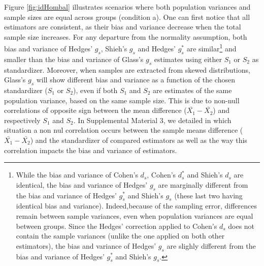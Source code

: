 \documentclass[
  english,
  man,floatsintext]{apa6}
\begin{document}
Figure \ref{fig:idHombal} illustrates scenarios where both population variances and sample sizes are equal across groups (condition a). One can first notice that all estimators are consistent, as their bias and variance decrease when the total sample size increases. For any departure from the normality assumption, both bias and variance of Hedges' \(g_s\), Shieh's \(g_s\) and Hedges' \(g^*_s\) are similar\footnote{While the bias and variance of Cohen's $d_s$, Cohen's $d^*_s$ and Shieh's $d_s$ are identical, the bias and variance of Hedges' $g_s$ are marginally different from the bias and variance of Hedges' $g^*_s$ and Shieh's $g_s$ (these last two having identical bias and variance). Indeed,because of the sampling error, differences remain between sample variances, even when population variances are equal between groups. Since the Hedges' correction applied to Cohen's $d_s$ does not contain the sample variances (unlike the one applied on both other estimators), the bias and variance of Hedges' $g_s$ are slighly different from the bias and variance of Hedges' $g^*_s$ and Shieh's $g_s$.} and smaller than the bias and variance of Glass's \(g_s\) estimates using either \(S_1\) or \(S_2\) as standardizer. Moreover, when samples are extracted from skewed distributions, Glass's \(g_s\) will show different bias and variance as a function of the chosen standardizer (\(S_1\) or \(S_2\)), even if both \(S_1\) and \(S_2\) are estimates of the same population variance, based on the same sample size. This is due to non-null correlations of opposite sign between the mean difference (\(\bar{X_1}-\bar{X_2}\)) and respectively \(S_1\) and \(S_2\). In Supplemental Material 3, we detailed in which situation a non nul correlation occurs between the sample means difference (\(\bar{X_1}-\bar{X_2}\)) and the standardizer of compared estimators as well as the way this correlation impacts the bias and variance of estimators.
\end{document}
